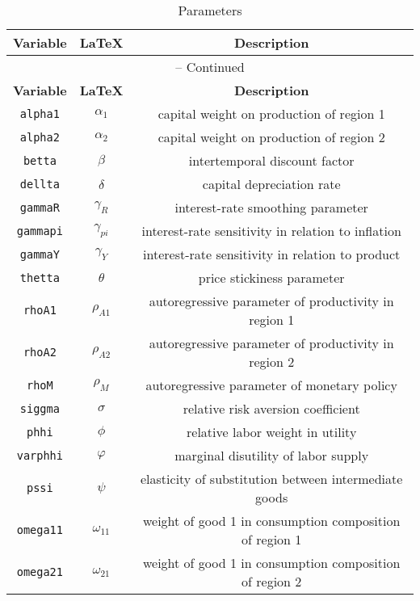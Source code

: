 \begin{center}
\begin{longtable}{ccc}
\caption{Parameters}\\%
\hline%
\multicolumn{1}{c}{\textbf{Variable}} &
\multicolumn{1}{c}{\textbf{\LaTeX}} &
\multicolumn{1}{c}{\textbf{Description}}\\%
\hline\hline%
\endfirsthead
\multicolumn{3}{c}{{\tablename} \thetable{} -- Continued}\\%
\hline%
\multicolumn{1}{c}{\textbf{Variable}} &
\multicolumn{1}{c}{\textbf{\LaTeX}} &
\multicolumn{1}{c}{\textbf{Description}}\\%
\hline\hline%
\endhead
\texttt{alpha1} & ${\alpha_{1}}$ & capital weight on production of region 1\\
\texttt{alpha2} & ${\alpha_{2}}$ & capital weight on production of region 2\\
\texttt{betta} & ${\beta}$ & intertemporal discount factor\\
\texttt{dellta} & ${\delta}$ & capital depreciation rate\\
\texttt{gammaR} & ${\gamma_{R}}$ & interest-rate smoothing parameter\\
\texttt{gammapi} & ${\gamma_{pi}}$ & interest-rate sensitivity in relation to inflation\\
\texttt{gammaY} & ${\gamma_{Y}}$ & interest-rate sensitivity in relation to product\\
\texttt{thetta} & ${\theta}$ & price stickiness parameter\\
\texttt{rhoA1} & ${\rho_{A1}}$ & autoregressive parameter of productivity in region 1\\
\texttt{rhoA2} & ${\rho_{A2}}$ & autoregressive parameter of productivity in region 2\\
\texttt{rhoM} & ${\rho_{M}}$ & autoregressive parameter of monetary policy\\
\texttt{siggma} & ${\sigma}$ & relative risk aversion coefficient\\
\texttt{phhi} & ${\phi}$ & relative labor weight in utility\\
\texttt{varphhi} & ${\varphi}$ & marginal disutility of labor supply\\
\texttt{pssi} & ${\psi}$ & elasticity of substitution between intermediate goods\\
\texttt{omega11} & ${\omega_{11}}$ & weight of good 1 in consumption composition of region 1\\
\texttt{omega21} & ${\omega_{21}}$ & weight of good 1 in consumption composition of region 2\\

\end{longtable}
\end{center}
